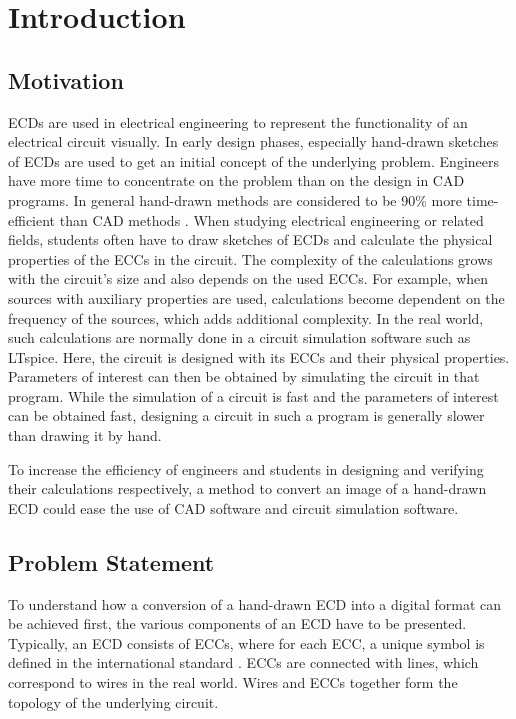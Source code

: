 \chapter{Introduction}

\section{Motivation}


\acp{ECD} are used in electrical engineering to represent the functionality of an electrical circuit visually.
In early design phases, especially hand-drawn sketches of \acp{ECD} are used to get an initial concept of the underlying problem.
Engineers have more time to concentrate on the problem than on the design in \ac{CAD} programs.
In general hand-drawn methods are considered to be 90\% more time-efficient than \ac{CAD} methods \cite{ecd_ctxindependentsvm}.
When studying electrical engineering or related fields, students often have to draw sketches of \acp{ECD} and calculate the physical properties of the \acp{ECC} in the circuit.
The complexity of the calculations grows with the circuit's size and also depends on the used \acp{ECC}.
For example, when sources with auxiliary properties are used, calculations become dependent on the frequency of the sources, which adds additional complexity.
In the real world, such calculations are normally done in a circuit simulation software such as LTspice.
Here, the circuit is designed with its \acp{ECC} and their physical properties.
Parameters of interest can then be obtained by simulating the circuit in that program.
While the simulation of a circuit is fast and the parameters of interest can be obtained fast, designing a circuit in such a program is generally slower than drawing it by hand.

To increase the efficiency of engineers and students in designing and verifying their calculations respectively, a method to convert an image of a hand-drawn \ac{ECD} could ease the use of \ac{CAD} software and circuit simulation software.

\section{Problem Statement}
\label{sec:problem_statement}

To understand how a conversion of a hand-drawn \ac{ECD} into a digital format can be achieved first, the various components of an \ac{ECD} have to be presented.
Typically, an \ac{ECD} consists of \acp{ECC}, where for each \ac{ECC}, a unique symbol is defined in the international standard \cite{iec60617}.
\acp{ECC} are connected with lines, which correspond to wires in the real world.
Wires and \acp{ECC} together form the topology of the underlying circuit.

